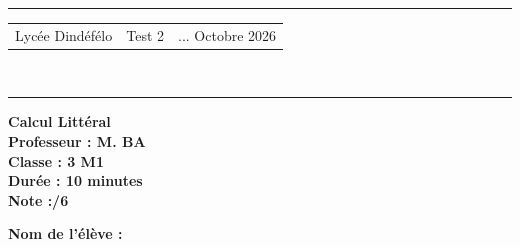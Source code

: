 \documentclass[a4paper,12pt]{article}
\begin{document}
\hrule %
\begin{center}
    \begin{tabular}{@{} p{5cm} p{5cm} p{5cm} @{}} %
        Lycée Dindéfélo & \quad\quad\quad Test 2 & ... Octobre 2026 \\
    \end{tabular}
    \\[-0.01cm] %
    \hrule %
\end{center}
\begin{center}
    \textbf{\Large Calcul Littéral } \\[0.2cm]
    \textbf{\large Professeur : M. BA} \\[0.2cm]
    \textbf{Classe : 3 M1} \\[0.2cm]
    \textbf{\small Durée : 10 minutes} \\[0.2cm]
    \textbf{\small Note :\quad\quad /6}
\end{center}

\textbf{\small Nom de l'élève :} \underline{\hspace{8cm}} \\[0.5cm]
\end{document}
